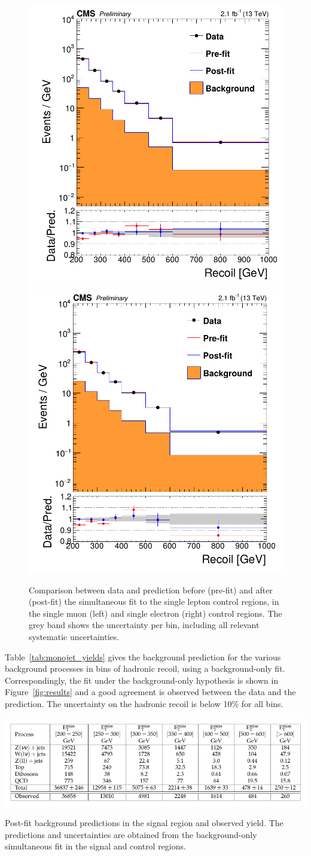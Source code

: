 \begin{figure}[p]
  \centering
 \includegraphics[width=.49\textwidth]{postfit_singlemuon.png} 
 \includegraphics[width=.49\textwidth]{postfit_singleelectron.png}
 \caption{Comparison between data and prediction before (pre-fit) and after (post-fit) the simultaneous fit to the single lepton control regions, in the single muon (left) and single electron (right) control regions. The grey band shows the uncertainty per bin, including all relevant systematic uncertainties.}
 \label{fig:postfit_2}
\end{figure}

Table~\ref{tab:monojet_yields} gives the background prediction for the various background processes in bins of hadronic recoil, using a background-only fit. Correspondingly, the fit under the background-only hypothesis is shown in Figure~\ref{fig:results} and a good agreement is observed between the data and the prediction. The uncertainty on the hadronic recoil is below 10\% for all bins.

\begin{table}[ht]
  \centering
 \includegraphics[width=\textwidth]{yields.pdf} 
 \caption{Post-fit background predictions in the signal region and observed yield. The predictions and uncertainties are obtained from the background-only simultaneous fit in the signal and control regions.}
 \label{tab:monojet_yields}
\end{table}

